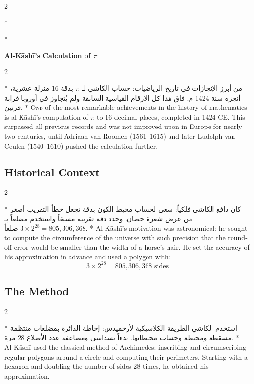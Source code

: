 \documentclass[11pt,a4paper]{article}
\newcommand{\ar}[1]{{\arabicfont\beginR #1\endR}}
\newenvironment{bilingual}{%
  \vspace{0.3em}%
  \begin{paracol}{2}%
}{%
  \end{paracol}%
  \vspace{0.3em}%
}
\begin{document}
\begin{bilingual}
\switchcolumn[0]*
\begin{center}
\textbf{\Large\color{chapcolor}\ar{رسالة المحيطية في إيجاد نسبة المحيط إلى القطر}}
\end{center}
\switchcolumn[1]*
\begin{center}
\textbf{\Large\color{chapcolor}Al-K\=ash\=i's Calculation of $\pi$}
\end{center}
\end{bilingual}

\begin{bilingual}
\switchcolumn[0]*
\ar{من أبرز الإنجازات في تاريخ الرياضيات: حساب الكاشي لـ $\pi$ بدقة 16 منزلة عشرية، أنجزه سنة 1424 م. فاق هذا كل الأرقام القياسية السابقة ولم يُتجاوز في أوروبا قرابة قرنين.}
\switchcolumn[1]*
\lettrine[lines=3, nindent=0em, findent=3pt]{\color{chapcolor}O}{ne}
of the most remarkable achievements in the history of mathematics is
al-K\=ash\=i's computation of $\pi$ to 16 decimal places, completed in 1424
CE. This surpassed all previous records and was not improved upon in
Europe for nearly two centuries, until Adriaan van Roomen (1561--1615)
and later Ludolph van Ceulen (1540--1610) pushed the calculation
further.
\end{bilingual}

\subsection{Historical Context}

\begin{bilingual}
\switchcolumn[0]*
\ar{كان دافع الكاشي فلكياً: سعى لحساب محيط الكون بدقة تجعل خطأ التقريب أصغر من عرض شعرة حصان. وحدد دقة تقريبه مسبقاً واستخدم مضلعاً بـ $3 \times 2^{28} = 805{,}306{,}368$ ضلعاً.}
\switchcolumn[1]*
Al-K\=ash\=i's motivation was astronomical: he sought to compute the
circumference of the universe with such precision that the round-off
error would be smaller than the width of a horse's hair. He set the
accuracy of his approximation in advance and used a polygon with:
\[
3 \times 2^{28} = 805{,}306{,}368 \text{ sides}
\]
\end{bilingual}

\subsection{The Method}

\begin{bilingual}
\switchcolumn[0]*
\ar{استخدم الكاشي الطريقة الكلاسيكية لأرخميدس: إحاطة الدائرة بمضلعات منتظمة مسقطة ومحيطة وحساب محيطاتها. بدءاً بسداسي ومضاعفة عدد الأضلاع 28 مرة.}
\switchcolumn[1]*
Al-K\=ash\=i used the classical method of Archimedes: inscribing and
circumscribing regular polygons around a circle and computing their
perimeters. Starting with a hexagon and doubling the number of sides
28 times, he obtained his approximation.
\end{bilingual}
\end{document}

